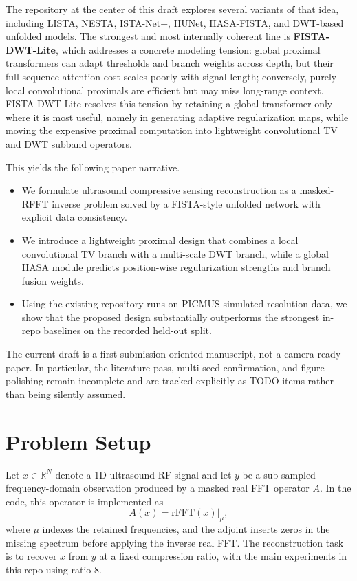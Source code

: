 \documentclass{article}
\begin{document}
The repository at the center of this draft explores several variants of that idea, including LISTA, NESTA, ISTA-Net+, HUNet, HASA-FISTA, and DWT-based unfolded models. The strongest and most internally coherent line is \textbf{FISTA-DWT-Lite}, which addresses a concrete modeling tension: global proximal transformers can adapt thresholds and branch weights across depth, but their full-sequence attention cost scales poorly with signal length; conversely, purely local convolutional proximals are efficient but may miss long-range context. FISTA-DWT-Lite resolves this tension by retaining a global transformer only where it is most useful, namely in generating adaptive regularization maps, while moving the expensive proximal computation into lightweight convolutional TV and DWT subband operators.

This yields the following paper narrative.
\begin{itemize}[leftmargin=*, noitemsep]
  \item We formulate ultrasound compressive sensing reconstruction as a masked-RFFT inverse problem solved by a FISTA-style unfolded network with explicit data consistency.
  \item We introduce a lightweight proximal design that combines a local convolutional TV branch with a multi-scale DWT branch, while a global HASA module predicts position-wise regularization strengths and branch fusion weights.
  \item Using the existing repository runs on PICMUS simulated resolution data, we show that the proposed design substantially outperforms the strongest in-repo baselines on the recorded held-out split.
\end{itemize}

The current draft is a first submission-oriented manuscript, not a camera-ready paper. In particular, the literature pass, multi-seed confirmation, and figure polishing remain incomplete and are tracked explicitly as TODO items rather than being silently assumed.

\section{Problem Setup}
Let $x \in \mathbb{R}^{N}$ denote a 1D ultrasound RF signal and let $y$ be a sub-sampled frequency-domain observation produced by a masked real FFT operator $A$. In the code, this operator is implemented as
\[
A(x) = \mathrm{rFFT}(x)\vert_{\mu},
\]
where $\mu$ indexes the retained frequencies, and the adjoint inserts zeros in the missing spectrum before applying the inverse real FFT. The reconstruction task is to recover $x$ from $y$ at a fixed compression ratio, with the main experiments in this repo using ratio 8.
\end{document}
